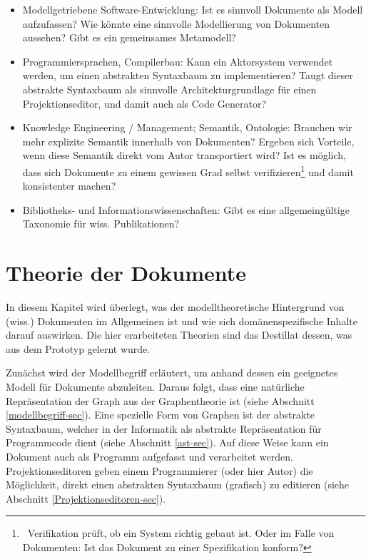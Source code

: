  
\begin{itemize}

\item
Modellgetriebene Software-Entwicklung: Ist es sinnvoll Dokumente als Modell aufzufassen? Wie könnte eine sinnvolle Modellierung von Dokumenten aussehen? Gibt es ein gemeinsames Metamodell?


\item
Programmiersprachen, Compilerbau: Kann ein Aktorsystem verwendet werden, um einen abstrakten Syntaxbaum zu implementieren? Taugt dieser abstrakte Syntaxbaum als sinnvolle Architekturgrundlage für einen Projektionseditor, und damit auch als Code Generator?


\item
Knowledge Engineering / Management; Semantik, Ontologie: Brauchen wir mehr explizite Semantik innerhalb von Dokumenten? Ergeben sich Vorteile, wenn diese Semantik direkt vom Autor transportiert wird? Ist es möglich, dass sich Dokumente zu einem gewissen Grad selbst verifizieren\footnote{~Verifikation prüft, ob ein System richtig gebaut ist. Oder im Falle von Dokumenten: Ist das Dokument zu einer Spezifikation konform?} und damit konsistenter machen?


\item
Bibliotheks- und Informationswissenschaften: Gibt es eine allgemeingültige Taxonomie für wiss. Publikationen?


\end{itemize}
 
\chapter{Theorie der Dokumente}\label{}
 
In diesem Kapitel wird überlegt, was der modelltheoretische Hintergrund von (wiss.) Dokumenten im Allgemeinen ist und wie sich domänenspezifische Inhalte darauf auswirken. Die hier erarbeiteten Theorien sind das Destillat dessen, was aus dem Prototyp gelernt wurde.

 
Zunächst wird der Modellbegriff erläutert, um anhand dessen ein geeignetes Modell für Dokumente abzuleiten. Daraus folgt, dass eine natürliche Repräsentation der Graph aus der Graphentheorie ist (siehe Abschnitt \ref{modellbegriff-sec}). Eine spezielle Form von Graphen ist der abstrakte Syntaxbaum, welcher in der Informatik als abstrakte Repräsentation für Programmcode dient (siehe Abschnitt \ref{ast-sec}). Auf diese Weise kann ein Dokument auch als Programm aufgefasst und verarbeitet werden. Projektionseditoren geben einem Programmierer (oder hier Autor) die Möglichkeit, direkt einen abstrakten Syntaxbaum (grafisch) zu editieren (siehe Abschnitt \ref{Projektionseditoren-sec}).


